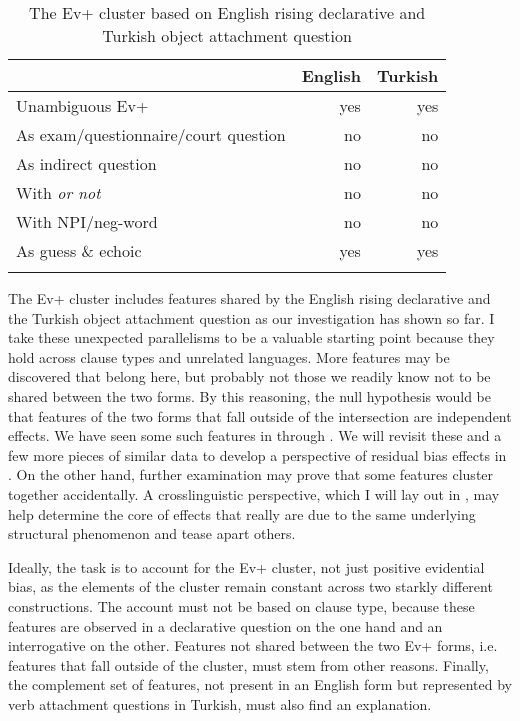 \documentclass[output=paper,colorlinks,citecolor=brown]{langscibook}
\begin{document}
\begin{table}
\caption{The Ev+ cluster based on English rising declarative and Turkish object attachment question}
\label{tab:11:tab1}
\begin{tabularx}{0.8\textwidth}{X rr} 
\lsptoprule
  
{} & English &  Turkish \\  %
  \midrule
Unambiguous Ev+ & yes & yes \\ %
As exam/questionnaire/court question & no & no \\ %
As indirect question & no & no \\ %
With \textit{or not} & no & no \\%
With NPI/neg-word & no & no \\ %
As guess \& echoic & yes & yes \\ %
  \lspbottomrule
\end{tabularx} 
\end{table}

The Ev+ cluster includes features shared by the English rising declarative and the Turkish object attachment question as our investigation has shown so far. I take these unexpected parallelisms to be a valuable starting point because they hold across clause types and unrelated languages. More features may be discovered that belong here, but probably not those we readily know not to be shared between the two forms. By this reasoning, the null hypothesis would be that features of the two forms that fall outside of the intersection are independent effects. We have seen some such features in  through . We will revisit these and a few more pieces of similar data to develop a perspective of residual bias effects in . On the other hand, further examination may prove that some features cluster together accidentally. A crosslinguistic perspective, which I will lay out in , may help determine the core of effects that really are due to the same underlying structural phenomenon and tease apart others.

Ideally, the task is to account for the Ev+ cluster, not just positive evidential bias, as the elements of the cluster remain constant across two starkly different constructions. The account must not be based on clause type, because these features are observed in a declarative question on the one hand and an interrogative on the other. Features not shared between the two Ev+ forms, i.e. features that fall outside of the cluster, must stem from other reasons. Finally, the complement set of features, not present in an English form but represented by verb attachment questions in Turkish, must also find an explanation.   
\end{document}
